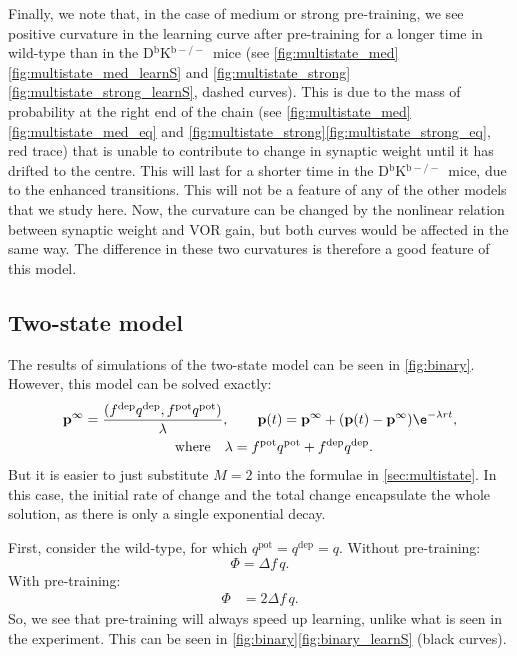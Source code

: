 \documentclass[12pt]{article}
\newcommand{\pr}{\mathbf{p}}
\newcommand{\eq}{\pr^\infty}
\newcommand{\pot}{^{\text{pot}}}
\newcommand{\dep}{^{\text{dep}}}
\newcommand{\KO}{D$^\mathrm{b}$K$^{\mathrm{b}-/-}$}
\begin{document}
Finally, we note that, in the case of medium or strong pre-training, we see positive curvature in the learning curve after pre-training for a longer time in wild-type than in the \KO\ mice (see \autoref{fig:multistate_med}\ref{fig:multistate_med_learnS} and \autoref{fig:multistate_strong}\ref{fig:multistate_strong_learnS}, dashed curves).
This is due to the mass of probability at the right end of the chain (see \autoref{fig:multistate_med}\ref{fig:multistate_med_eq} and \autoref{fig:multistate_strong}\ref{fig:multistate_strong_eq}, red trace) that is unable to contribute to change in synaptic weight until it has drifted to the centre.
This will last for a shorter time in the \KO\ mice, due to the enhanced transitions.
This will not be a feature of any of the other models that we study here.
Now, the curvature can be changed by the nonlinear relation between synaptic weight and VOR gain, but both curves would be affected in the same way.
The difference in these two curvatures is therefore a good feature of this model.


\subsection{Two-state model}\label{sec:binary}




The results of simulations of the two-state model can be seen in \autoref{fig:binary}.
However, this model can be solved exactly:
%
\begin{multline}\label{eq:binarysol}
  \eq = \frac{(f\dep q\dep, f\pot q\pot)}{\lambda},
  \qquad
  \pr(t) = \eq + (\pr(t)-\eq)\e^{-\lambda rt},\\
  \qquad \text{where} \quad
  \lambda = f\pot q\pot + f\dep q\dep.
\end{multline}
%
But it is easier to just substitute $M=2$ into the formulae in \autoref{sec:multistate}.
In this case, the initial rate of change and the total change encapsulate the whole solution, as there is only a single exponential decay.

First, consider the wild-type, for which $q\pot=q\dep=q$.
Without pre-training:
%
\begin{equation}\label{eq:binWTnopre}
  \Phi = {\Delta f}\, q.
\end{equation}
%
With pre-training:
%
\begin{equation}\label{eq:binWTpre}
\begin{aligned}
  \Phi &= 2{\Delta f}\, q.
\end{aligned}
\end{equation}
%
So, we see that pre-training will always speed up learning, unlike what is seen in the experiment.
This can be seen in \autoref{fig:binary}\ref{fig:binary_learnS} (black curves).
\end{document}
